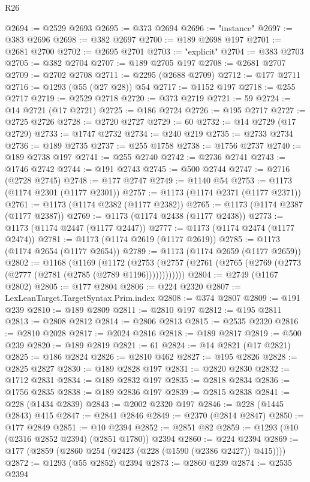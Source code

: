 \begin{lexlean}{R26}
\begin{coremodule}
@2694 := @2529 @2693
@2695 := @373 @2694
@2696 := "instance"
@2697 := @383 @2696
@2698 := @382 @2697
@2700 := @189 @2698 @197
@2701 := @2681 @2700
@2702 := @2695 @2701
@2703 := "explicit"
@2704 := @383 @2703
@2705 := @382 @2704
@2707 := @189 @2705 @197
@2708 := @2681 @2707
@2709 := @2702 @2708
@2711 := @2295 (@2688 @2709)
@2712 := @177 @2711
@2716 := @1293 (@55 (@27 @28)) @54
@2717 := @1152 @197
@2718 := @255 @2717
@2719 := @2529 @2718
@2720 := @373 @2719
@2721 := 59
@2724 := @14 @2721 (@17 @2721)
@2725 := @186 @2724
@2726 := @195 @2717
@2727 := @2725 @2726
@2728 := @2720 @2727
@2729 := 60
@2732 := @14 @2729 (@17 @2729)
@2733 := @1747 @2732
@2734 := @240 @219
@2735 := @2733 @2734
@2736 := @189 @2735
@2737 := @255 @1758
@2738 := @1756 @2737
@2740 := @189 @2738 @197
@2741 := @255 @2740
@2742 := @2736 @2741
@2743 := @1746 @2742
@2744 := @191 @2743
@2745 := @500 @2744
@2747 := @2716 (@2728 @2745)
@2748 := @177 @2747
@2749 := @1140 @54
@2753 := @1173 (@1174 @2301 (@1177 @2301))
@2757 := @1173 (@1174 @2371 (@1177 @2371))
@2761 := @1173 (@1174 @2382 (@1177 @2382))
@2765 := @1173 (@1174 @2387 (@1177 @2387))
@2769 := @1173 (@1174 @2438 (@1177 @2438))
@2773 := @1173 (@1174 @2447 (@1177 @2447))
@2777 := @1173 (@1174 @2474 (@1177 @2474))
@2781 := @1173 (@1174 @2619 (@1177 @2619))
@2785 := @1173 (@1174 @2654 (@1177 @2654))
@2789 := @1173 (@1174 @2659 (@1177 @2659))
@2802 := @1168
    (@1169
      (@1172 (@2753 (@2757 (@2761 (@2765 (@2769 (@2773 (@2777 (@2781 (@2785 (@2789 @1196))))))))))))
@2804 := @2749 (@1167 @2802)
@2805 := @177 @2804
@2806 := @224 @2320
@2807 := LexLeanTarget.TargetSyntax.Prim.index
@2808 := @374 @2807
@2809 := @191 @239
@2810 := @189 @2809
@2811 := @2810 @197
@2812 := @195 @2811
@2813 := @2808 @2812
@2814 := @2806 @2813
@2815 := @2535 @2320
@2816 := @2810 @2028
@2817 := @2024 @2816
@2818 := @189 @2817
@2819 := @500 @239
@2820 := @189 @2819
@2821 := 61
@2824 := @14 @2821 (@17 @2821)
@2825 := @186 @2824
@2826 := @2810 @462
@2827 := @195 @2826
@2828 := @2825 @2827
@2830 := @189 @2828 @197
@2831 := @2820 @2830
@2832 := @1712 @2831
@2834 := @189 @2832 @197
@2835 := @2818 @2834
@2836 := @1756 @2835
@2838 := @189 @2836 @197
@2839 := @2815 @2838
@2841 := @228 (@1434 @2839)
@2843 := @2002 @2320 @197
@2846 := @228 (@1445 @2843) @415
@2847 := @2841 @2846
@2849 := @2370 (@2814 @2847)
@2850 := @177 @2849
@2851 := @10 @2394
@2852 := @2851 @82
@2859 := @1293 (@10 (@2316 @2852 @2394) (@2851 @1780)) @2394
@2860 := @224 @2394
@2869 := @177 (@2859 (@2860 @254 (@2423 (@228 (@1590 (@2386 @2427)) @415))))
@2872 := @1293 (@55 @2852) @2394
@2873 := @2860 @239
@2874 := @2535 @2394

\end{coremodule}
\end{lexlean}
